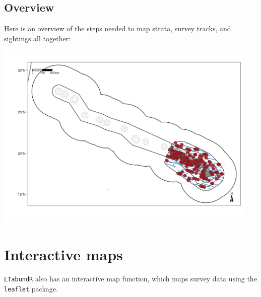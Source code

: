 \documentclass[
]{book}
\newenvironment{Shaded}{\begin{snugshade}}{\end{snugshade}}
\newcommand{\AttributeTok}[1]{\textcolor[rgb]{0.13,0.29,0.53}{#1}}
\newcommand{\DecValTok}[1]{\textcolor[rgb]{0.00,0.00,0.81}{#1}}
\newcommand{\FunctionTok}[1]{\textcolor[rgb]{0.13,0.29,0.53}{\textbf{#1}}}
\newcommand{\NormalTok}[1]{#1}
\newcommand{\OtherTok}[1]{\textcolor[rgb]{0.56,0.35,0.01}{#1}}
\newcommand{\SpecialCharTok}[1]{\textcolor[rgb]{0.81,0.36,0.00}{\textbf{#1}}}
\newcommand{\StringTok}[1]{\textcolor[rgb]{0.31,0.60,0.02}{#1}}
\begin{document}
\hypertarget{overview-1}{%
\subsection*{Overview}\label{overview-1}}

Here is an overview of the steps needed to map strata, survey tracks, and sightings all together:

\begin{Shaded}
\end{Shaded}

\includegraphics[width=0.95\textwidth,height=\textheight]{img/map_overview.png}

\hypertarget{interactive-maps}{%
\section*{Interactive maps}\label{interactive-maps}}

\texttt{LTabundR} also has an interactive map function, which maps survey data using the \texttt{leaflet} package.
\end{document}
